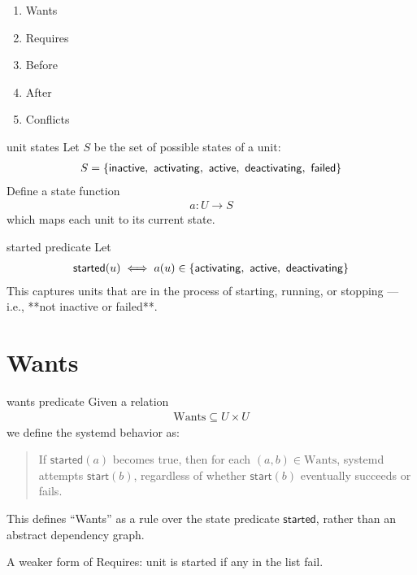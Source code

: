 \documentclass[openany, 12pt]{book}
\begin{document}

\begin{enumerate}[label = {(\arabic*)}]
  \item Wants
  \item Requires
  \item Before
  \item After
  \item Conflicts
\end{enumerate}

\begin{definition}{unit states}{}
  Let $S$ be the set of possible states of a unit:
  \begin{align*}
    S = \set{ \mathsf{inactive},\ \mathsf{activating},\ \mathsf{active},\ \mathsf{deactivating},\ \mathsf{failed}}
  \end{align*}
  Define a state function
  \begin{align*}
    a : U \to S
  \end{align*}
  which maps each unit to its current state.
\end{definition}

\begin{definition}{started predicate}{}
  Let
  \begin{align*}
    \mathsf{started}(u) \iff a(u) \in \set{ \mathsf{activating},\ \mathsf{active},\ \mathsf{deactivating}}
  \end{align*}
  This captures units that are in the process of starting, running, or
  stopping — i.e., **not inactive or failed**.
\end{definition}

\section{Wants}
\begin{definition}{wants predicate}{}
  Given a relation
  \begin{align*}
    \text{Wants} \subseteq U \times U
  \end{align*}
  we define the systemd behavior as:

  \begin{quote}
    If $\mathsf{started}(a)$ becomes true, then for each $(a, b) \in
      \text{Wants}$, systemd attempts $\mathsf{start}(b)$, regardless of
    whether $\mathsf{start}(b)$ eventually succeeds or fails.
  \end{quote}

  This defines ``Wants'' as a rule over the state predicate $\mathsf{started}$,
  rather than an abstract dependency graph.

  A weaker form of Requires: unit is started if any in the list fail.
\end{definition}
\end{document}
